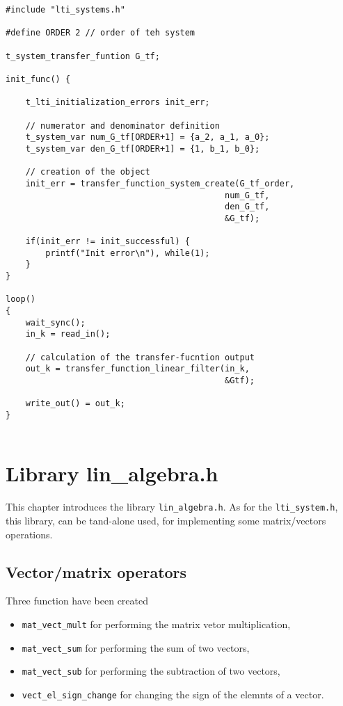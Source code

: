 \documentclass[12pt]{Template_}
\begin{document}
\begin{verbatim}
#include "lti_systems.h"

#define ORDER 2 // order of teh system

t_system_transfer_funtion G_tf;
	
init_func() {

    t_lti_initialization_errors init_err;
    
    // numerator and denominator definition
    t_system_var num_G_tf[ORDER+1] = {a_2, a_1, a_0};
    t_system_var den_G_tf[ORDER+1] = {1, b_1, b_0};

    // creation of the object	
    init_err = transfer_function_system_create(G_tf_order, 
                                            num_G_tf,
                                            den_G_tf,
                                            &G_tf);

    if(init_err != init_successful) {
        printf("Init error\n"), while(1);
    }
}

loop() 
{
    wait_sync();
    in_k = read_in();
    
    // calculation of the transfer-fucntion output
    out_k = transfer_function_linear_filter(in_k, 
                                            &Gtf);	
    
    write_out() = out_k;
}
	
\end{verbatim}

\chapter{Library lin\_algebra.h}
This chapter introduces the library \verb~lin_algebra.h~. As for the \verb~lti_system.h~, this library, can be tand-alone used, for implementing some matrix/vectors operations.

\section{Vector/matrix operators}
Three function have been created
\begin{itemize}
\item \verb~mat_vect_mult~ for performing the matrix vetor multiplication,
\item \verb~mat_vect_sum~ for performing the sum of two vectors,
\item \verb~mat_vect_sub~ for performing the subtraction of two vectors,
\item \verb~vect_el_sign_change~ for changing the sign of the elemnts of a vector.
\end{itemize}
\end{document}
